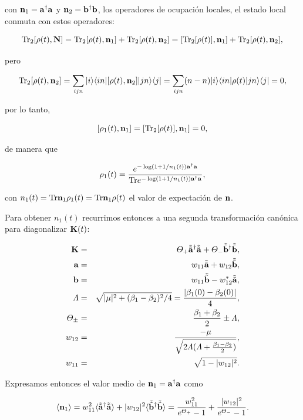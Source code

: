 \documentclass{report} %
\numberwithin{equation}{section}
\begin{document}
con ${\bf n}_1={\bf a}^\dagger{\bf a}$ y ${\bf n}_2={\mathbf b}^\dagger{\mathbf b}$, los operadores de ocupación locales, el estado local conmuta con estos operadores:

$$
{\Tr}_2 [\rho(t),{\bf N}]={\Tr}_2 [\rho(t),{\bf n}_1] + {\Tr}_2 [\rho(t),{\bf n}_2]=
[{\Tr}_2[\rho(t)],{\bf n}_1] + {\Tr}_2 [\rho(t),{\bf n}_2],
$$

pero

$$
{\Tr}_2 [\rho(t),{\bf n}_2] = \sum_{ijn} |i\rangle\langle in|[\rho(t),{\bf n}_2]|j n \rangle\langle  j|=
\sum_{ijn} (n-n)|i \rangle\langle  in|\rho(t)|j n \rangle\langle  j|=0,
$$

por lo tanto,

$$
[\rho_1(t),{\bf n}_1]=[{\Tr}_2[\rho(t)],{\bf n}_1]=0,
$$

de manera que

$$
\rho_1(t)=\frac{e^{-\log(1+1/n_1(t)){\mathbf a}^\dagger{\mathbf a}}}{{\Tr}e^{-\log(1+1/n_1(t)){\mathbf a}^\dagger{\mathbf a}}},
$$

con $n_1(t)={\Tr }{\bf n}_1\rho_1(t)={\Tr }{\bf n}_1\rho(t)$ el valor de expectación de ${\bf n}$.

Para obtener $n_1(t)$ recurrimos entonces a una segunda transformación canónica para diagonalizar ${\bf K}(t)$:

\begin{eqnarray*}
  {\bf K}&=& \Theta_+ \tilde{\tilde{\mathbf a}}^\dagger\tilde{\tilde{\mathbf a}} +
             \Theta_-
             \tilde{\tilde{\mathbf b}}^\dagger\tilde{\tilde{\mathbf b}},\\  
  {\mathbf a}&=&w_{11}\tilde{\tilde{\mathbf a}}+w_{12}\tilde{\tilde{\mathbf b}},\\
  {\mathbf b}&=&w_{11}\tilde{\tilde{\mathbf b}}-w_{12}^*\tilde{\tilde{\mathbf a}},\\
  \Lambda &=&\sqrt{|\mu|^2 + (\beta_1-\beta_2)^2/4}=\frac{|\beta_1(0)-\beta_2(0)|}{4},\\
  \Theta_{\pm}&=& \frac{\beta_1+\beta_2}{2}\pm  \Lambda,\\
  w_{12} &=& \frac{-\mu}{\sqrt{2 \Lambda(\Lambda + \frac{\beta_1-\beta_2}{2})}},\\
  w_{11} &=&  \sqrt{1-|w_{12}|^2}.
\end{eqnarray*}

Expresamos entonces el valor medio de ${\bf n}_1={\mathbf a}^\dagger{\mathbf a}$ como

\begin{equation}
\langle{\bf n}_1\rangle= w_{11}^2 \langle \tilde{\tilde{\mathbf a}}^\dagger \tilde{\tilde{\mathbf a}}\rangle + |w_{12}|^2
\langle \tilde{\tilde{\mathbf b}}^\dagger \tilde{\tilde{\mathbf b}}\rangle=
\frac{w_{11}^2 }{e^{\Theta_+}-1} +  \frac{|w_{12}|^2 }{e^{\Theta_-}-1}.
\label{model3.1.3_ocupation_number}
\end{equation}
\end{document}
